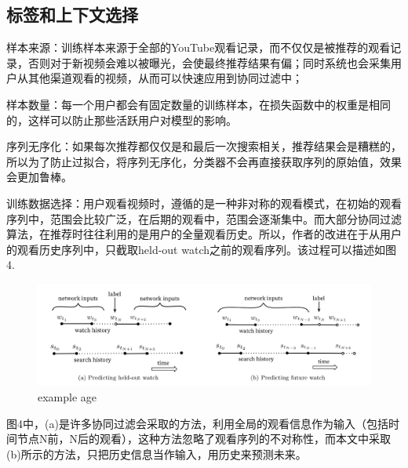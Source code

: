 \documentclass[UTF8]{ctexart}
\begin{document}
	\subsection{标签和上下文选择}
	样本来源：训练样本来源于全部的YouTube观看记录，而不仅仅是被推荐的观看记录，否则对于新视频会难以被曝光，会使最终推荐结果有偏；同时系统也会采集用户从其他渠道观看的视频，从而可以快速应用到协同过滤中；

	样本数量：每一个用户都会有固定数量的训练样本，在损失函数中的权重是相同的，这样可以防止那些活跃用户对模型的影响。

	序列无序化：如果每次推荐都仅仅是和最后一次搜索相关，推荐结果会是糟糕的，所以为了防止过拟合，将序列无序化，分类器不会再直接获取序列的原始值，效果会更加鲁棒。

	训练数据选择：用户观看视频时，遵循的是一种非对称的观看模式，在初始的观看序列中，范围会比较广泛，在后期的观看中，范围会逐渐集中。而大部分协同过滤算法，在推荐时往往利用的是用户的全量观看历史。所以，作者的改进在于从用户的观看历史序列中，只截取held-out watch之前的观看序列。该过程可以描述如图4.
	\begin{figure}[ht]
	    \centering
	    \includegraphics[scale=0.5]{picture/004.png}
	    \caption{example age}
	    \label{fig:004}
	\end{figure}
	图4中，(a)是许多协同过滤会采取的方法，利用全局的观看信息作为输入（包括时间节点N前，N后的观看），这种方法忽略了观看序列的不对称性，而本文中采取(b)所示的方法，只把历史信息当作输入，用历史来预测未来。
\end{document}
